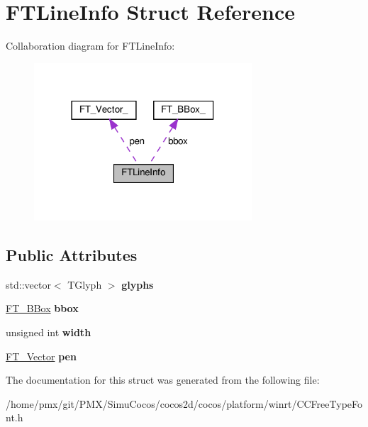 \hypertarget{structFTLineInfo}{}\section{F\+T\+Line\+Info Struct Reference}
\label{structFTLineInfo}


Collaboration diagram for F\+T\+Line\+Info\+:
\nopagebreak
\begin{figure}[H]
\begin{center}
\leavevmode
\includegraphics[width=230pt]{structFTLineInfo__coll__graph}
\end{center}
\end{figure}
\subsection*{Public Attributes}
\begin{DoxyCompactItemize}
\item 
\mbox{\label{structFTLineInfo_a96c80dab5be43ff06786f2f5bedfeeda}} 
std\+::vector$<$ T\+Glyph $>$ {\bfseries glyphs}
\item 
\mbox{\label{structFTLineInfo_a1c7e7e78d7b4b17b003a41320ce09884}} 
\hyperlink{structFT__BBox__}{F\+T\+\_\+\+B\+Box} {\bfseries bbox}
\item 
\mbox{\label{structFTLineInfo_adcf17beb91a0c1dd699655b3f5d3dae6}} 
unsigned int {\bfseries width}
\item 
\mbox{\label{structFTLineInfo_aaa870f54586a06c642abf4daf8fdb581}} 
\hyperlink{structFT__Vector__}{F\+T\+\_\+\+Vector} {\bfseries pen}
\end{DoxyCompactItemize}


The documentation for this struct was generated from the following file\+:\begin{DoxyCompactItemize}
\item 
/home/pmx/git/\+P\+M\+X/\+Simu\+Cocos/cocos2d/cocos/platform/winrt/C\+C\+Free\+Type\+Font.\+h\end{DoxyCompactItemize}
